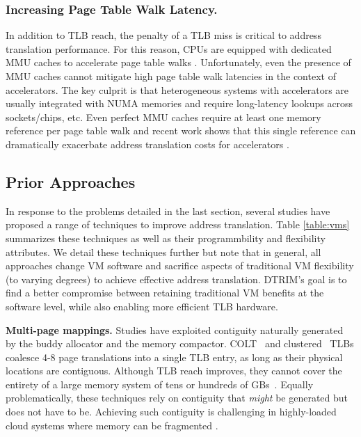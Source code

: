 \subsubsection{Increasing Page Table Walk Latency.} 
In addition to TLB reach, the penalty of a TLB miss is critical to
address translation performance. For this reason, CPUs are equipped
with dedicated MMU caches to accelerate page table walks
\cite{bhattacharjee:large-reach, barr:translation}. Unfortunately,
even the presence of MMU caches cannot mitigate high page table walk
latencies in the context of accelerators. The key culprit is that
heterogeneous systems with accelerators are usually integrated with
NUMA memories and require long-latency lookups across sockets/chips,
etc. Even perfect MMU caches require at least one memory reference per
page table walk and recent work shows that this single reference can
dramatically exacerbate address translation costs for accelerators
\cite{picorel:near-memory, pichai:architectural}.

\subsection{Prior Approaches}

In response to the problems detailed in the last section, several
studies have proposed a range of techniques to improve address
translation. Table \ref{table:vms} summarizes these techniques as well
as their programmbility and flexibility attributes. We detail these
techniques further but note that in general, all approaches change VM
software and sacrifice aspects of traditional VM flexibility (to
varying degrees) to achieve effective address translation. DTRIM's
goal is to find a better compromise between retaining traditional VM
benefits at the software level, while also enabling more efficient TLB
hardware.

\vspace{2mm}
\noindent\textbf{Multi-page mappings.} Studies have exploited
contiguity naturally generated by the buddy allocator and the memory
compactor. COLT~\cite{pham:colt} and clustered~\cite{pham:increasing}
TLBs coalesce 4-8 page translations into a single TLB entry, as long
as their physical locations are contiguous. Although TLB reach
improves, they cannot cover the entirety of a large memory system of
tens or hundreds of GBs~\cite{gandhi:range}.  Equally problematically,
these techniques rely on contiguity that {\it might} be generated but
does not have to be. Achieving such contiguity is challenging in
highly-loaded cloud systems where memory can be fragmented
\cite{pham:colt}.

